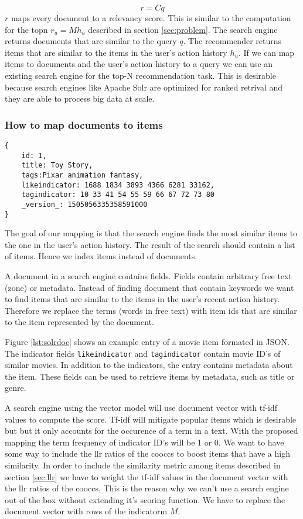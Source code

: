 \begin{equation}
  \label{eq:ser}
  r = C q
\end{equation}
$r$ maps every document to a relevancy score.
This is similar to the computation for the \gls{topn} $r_u = M h_u$  described in section \ref{sec:problem}. The search engine returns documents that are similar to the query $q$. The recommender returns items that are similar to the items in the user's action history $h_u$. If we can map items to documents and the user's action history to a query we can use an existing search engine for the top-N recommendation task. This is desirable because search engines like Apache Solr are optimized for ranked retrival and they are able to process big data at scale. 

\subsubsection{How to map documents to items}

\begin{lstlisting}[caption={Item metadata and similar items are stored in Solr.},label={lst:solrdoc}]
{
    id: 1,
    title: Toy Story,
    tags:Pixar animation fantasy,
    likeindicator: 1688 1834 3893 4366 6281 33162,
    tagindicator: 10 33 41 54 55 59 66 67 72 73 80
    _version_: 1505056335358591000
}
\end{lstlisting}

The goal of our mapping is that the search engine finds the most similar items to the one in the user's action history.
The result of the search should contain a list of items. Hence we index items instead of documents.

A document in a search engine contains fields. Fields contain arbitrary free text (zone) or metadata. 
Instead of finding document that contain keywords we want to find items that are similar to the items in the user's recent action history. Therefore we replace the terms (words in free text) with item ids that are similar to the item represented by the document. 

Figure \ref{lst:solrdoc} shows an example entry of a movie item formated in JSON. The indicator fields \verb|likeindicator| and \verb|tagindicator| contain movie ID's of similar movies. In addition to the indicators, the entry contains metadata about the item. These fields can be used to retrieve items by metadata, such as title or genre.

A search engine using the vector model will use document vector with tf-idf values to compute the score. Tf-idf will mitigate popular items which is desirable but but it only accounts for the occurence of a term in a text. With the proposed mapping the term frequency of indicator ID's will be 1 or 0. We want to have some way to include the \gls{llr} ratios of the \glspl{coocc} to boost items that have a high similarity. In order to include the similarity metric among items described in section \ref{sec:llr} we have to weight the tf-idf values in the document vector with the \gls{llr} ratios of the \glspl{coocc}. This is the reason why we can't use a search engine out of the box without extending it's scoring function.
We have to replace the document vector with rows of the \gls{indicatorm} $M$. 

